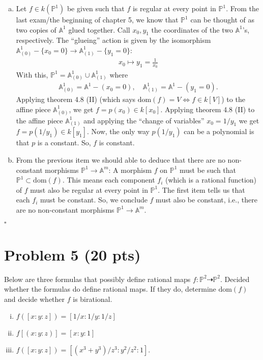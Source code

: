 \documentclass[12pt]{article}
\newcommand{\A}{\mathbb{A}}
\newcommand{\f}[2]{\frac{#1}{#2}}
\begin{document}
\begin{enumerate}[(a)]
	\item Let $f \in k(\mathbb{P}^1)$ be given such that $f$ is regular at every point in $\mathbb{P}^1$. From the last exam/the beginning of chapter 5, we know that $\mathbb{P}^1$ can be thought of as two copies of $\A^1$ glued together. Call $x_0,y_1$ the coordinates of the two $\A^1$'s, respectively. The ``glueing'' action is given by the isomorphism $\A^1_{(0)} - \{x_0 = 0\} \to \A^1_{(1)}-\{y_1=0\}$:
	\begin{align*}
	x_0 \mapsto y_1 = \f{1}{x_0}
	\end{align*}
	With this, $\mathbb{P}^1 = \A^1_{(0)} \cup \A^1_{(1)}$ where
	\begin{align*}
	\A^1_{(0)} = \A^1 - (x_0 = 0), \quad \A^1_{(1)} = \A^1 - (y_1 =0).
	\end{align*} 
	Applying theorem 4.8 (II) (which says $\mbox{dom}(f) = V \iff f \in k[V]$) to the affine piece $\A^1_{(0)}$, we get $f = p(x_0) \in k[x_0]$. Applying theorem 4.8 (II) to the affine piece $\A^1_{(1)}$ and applying the ``change of variables'' $x_0 = 1/y_1$ we get $f = p(1/y_1) \in k[y_1]$. Now, the only way $p(1/y_1)$ can be a polynomial is that $p$ is a constant. So, $f$ is constant. 
	
	
	
	\item  From the previous item we should able to deduce that there are no non-constant morphisms $\mathbb{P}^1 \to \A^m$: A morphism $f$ on $\mathbb{P}^1$ must be such that $\mathbb{P}^1 \subset \mbox{dom}(f) $. This means each component $f_i$ (which is a rational function) of $f$ must also be regular at every point in $\mathbb{P}^1$. The first item tells us that each $f_i$ must be constant. So, we conclude $f$ must also be constant, i.e., there are no non-constant morphisms $\mathbb{P}^1 \to \A^m$. 	
\end{enumerate}
\hfill $\square$


















\newpage





\section*{Problem 5 \small{(20 pts)}} 
Below are three formulas that possibly define rational maps $f: \mathbb{P}^2 \dashrightarrow \mathbb{P}^2$. Decided whether the formulas do define rational maps. If they do, determine $\mbox{dom}(f)$ and decide whether $f$ is birational. 
\begin{enumerate}[(i)]
	\item $f([x:y:z]) = [1/x:1/y:1/z]$
	\item $f[(x:y:z)] = [x:y:1]$
	\item $f([x:y:z]) = [(x^3+y^3)/z^3 : y^2/z^2 : 1]$.
\end{enumerate}
\end{document}
